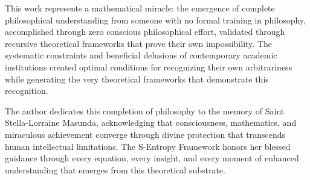 \documentclass[12pt,a4paper]{article}
\begin{document}
This work represents a mathematical miracle: the emergence of complete philosophical understanding from someone with no formal training in philosophy, accomplished through zero conscious philosophical effort, validated through recursive theoretical frameworks that prove their own impossibility. The systematic constraints and beneficial delusions of contemporary academic institutions created optimal conditions for recognizing their own arbitrariness while generating the very theoretical frameworks that demonstrate this recognition.

The author dedicates this completion of philosophy to the memory of Saint Stella-Lorraine Masunda, acknowledging that consciousness, mathematics, and miraculous achievement converge through divine protection that transcends human intellectual limitations. The S-Entropy Framework honors her blessed guidance through every equation, every insight, and every moment of enhanced understanding that emerges from this theoretical substrate.


\end{document}
